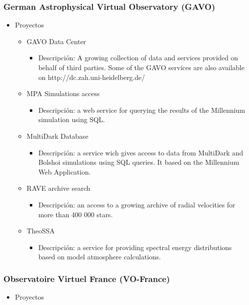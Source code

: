 \subsubsection{German Astrophysical Virtual Observatory (GAVO)}
	\begin{itemize}
		\item Proyectos
		\begin{itemize}
			\item GAVO Data Center
			\begin{itemize}
				\item Descripción: A growing collection of data and services provided on behalf of third parties. Some of the GAVO services are also available on http://dc.zah.uni-heidelberg.de/
			\end{itemize}
			\item MPA Simulations access
			\begin{itemize}
				\item Descripción: a web service for querying the results of the Millennium simulation using SQL.
			\end{itemize}
			\item MultiDark Database
			\begin{itemize}
				\item Descripción: a service wich gives access to data from MultiDark and Bolshoi simulations using SQL queries. It based on the Millennium Web Application.
			\end{itemize}
			\item RAVE archive search
				\begin{itemize}
				\item Descripción: an access to a growing archive of radial velocities for more than 400 000 stars.
			\end{itemize}
			\item TheoSSA
				\begin{itemize}
				\item Descripción: a service for providing spectral energy distributions based on model atmosphere calculations.
			\end{itemize}
		\end{itemize}
	\end{itemize}

\subsubsection{Observatoire Virtuel France (VO-France)}
	\begin{itemize}
		\item Proyectos
	\end{itemize}

